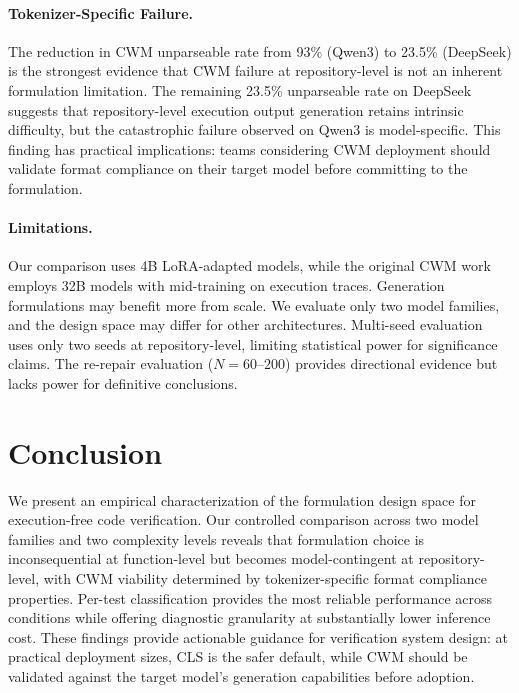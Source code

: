 \documentclass[11pt]{article}
\begin{document}
\paragraph{Tokenizer-Specific Failure.}
The reduction in CWM unparseable rate from 93\% (Qwen3) to 23.5\% (DeepSeek) is the strongest evidence that CWM failure at repository-level is not an inherent formulation limitation. The remaining 23.5\% unparseable rate on DeepSeek suggests that repository-level execution output generation retains intrinsic difficulty, but the catastrophic failure observed on Qwen3 is model-specific. This finding has practical implications: teams considering CWM deployment should validate format compliance on their target model before committing to the formulation.

\paragraph{Limitations.}
Our comparison uses 4B LoRA-adapted models, while the original CWM work employs 32B models with mid-training on execution traces. Generation formulations may benefit more from scale. We evaluate only two model families, and the design space may differ for other architectures. Multi-seed evaluation uses only two seeds at repository-level, limiting statistical power for significance claims. The re-repair evaluation ($N=60$--$200$) provides directional evidence but lacks power for definitive conclusions.

\section{Conclusion}
\label{sec:conclusion}

We present an empirical characterization of the formulation design space for execution-free code verification. Our controlled comparison across two model families and two complexity levels reveals that formulation choice is inconsequential at function-level but becomes model-contingent at repository-level, with CWM viability determined by tokenizer-specific format compliance properties. Per-test classification provides the most reliable performance across conditions while offering diagnostic granularity at substantially lower inference cost. These findings provide actionable guidance for verification system design: at practical deployment sizes, CLS is the safer default, while CWM should be validated against the target model's generation capabilities before adoption.
\end{document}

